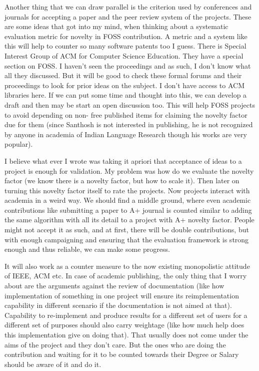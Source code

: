 {Another thing that we can draw parallel is the criterion used
by conferences and journals for accepting a paper and the peer review system
of the projects. These are some ideas that got into my mind, when thinking about a
systematic evaluation metric for novelty in FOSS contribution. A metric
and a system like this will help to counter so many software patents too I guess.
There is Special Interest Group of ACM for Computer Science Education.
They have a special section on FOSS. I haven't seen the proceedings and as such, I
don't know what all they discussed. But it will be good to check these
formal forums and their proceedings to look for prior ideas on the subject.
I don't have access to ACM libraries here. If we can put some time and
thought into this, we can develop a draft and then may be start an open
discussion too. This will help FOSS projects to avoid depending on non-
free published items for claiming the novelty factor due for them (since
Santhosh is not interested in publishing, he is not recognized by anyone
in academia of Indian Language Research though his works are very popular).


I believe what ever I wrote was taking it apriori that acceptance of ideas
to a project is enough for validation. My problem was how do we evaluate
the novelty factor (we know there is a novelty factor, but how to scale it).
Then later on turning this novelty factor itself to rate the projects.
Now projects interact with academia in a weird way. We should find a middle
ground, where even academic contributions like submitting a paper to A+
journal is counted similar to adding the same algorithm with all its detail
to a project with A+ novelty factor. People might not accept it as such,
and at first, there will be double contributions, but with enough campaigning
and ensuring that the evaluation framework is strong enough and thus reliable,
we can make some progress.

It will also work as a counter measure to the now existing
monopolistic attitude of IEEE, ACM etc. In case of academic publishing, the
only thing that I worry about are the arguments against the review of documentation 
(like how implementation of something in one project will ensure its
reimplementation capability in different scenario if the documentation
is not aimed at that). Capability to re-implement and produce results for
a different set of users for a different set of purposes should also carry
weightage (like how much help does this implementation give on doing that).
That usually does not come under the aims of the project and they don't care.
But the ones who are doing the contribution and waiting for it to be counted
towards their Degree or Salary should be aware of it and do it.

}
